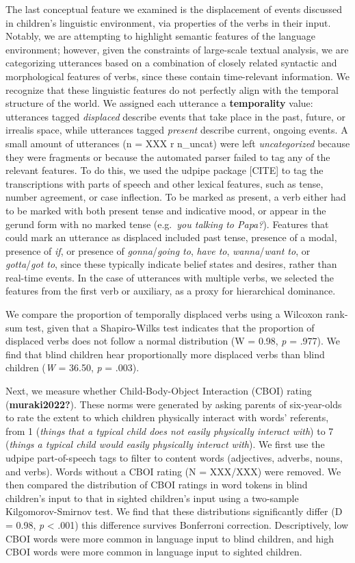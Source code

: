 \documentclass[
  man,floatsintext]{apa6}
\begin{document}
The last conceptual feature we examined is the displacement of events discussed in children's linguistic environment, via properties of the verbs in their input. Notably, we are attempting to highlight semantic features of the language environment; however, given the constraints of large-scale textual analysis, we are categorizing utterances based on a combination of closely related syntactic and morphological features of verbs, since these contain time-relevant information. We recognize that these linguistic features do not perfectly align with the temporal structure of the world. We assigned each utterance a \textbf{temporality} value: utterances tagged \emph{displaced} describe events that take place in the past, future, or irrealis space, while utterances tagged \emph{present} describe current, ongoing events. A small amount of utterances (n = XXX r n\_uncat) were left \emph{uncategorized} because they were fragments or because the automated parser failed to tag any of the relevant features. To do this, we used the udpipe package {[}CITE{]} to tag the transcriptions with parts of speech and other lexical features, such as tense, number agreement, or case inflection. To be marked as present, a verb either had to be marked with both present tense and indicative mood, or appear in the gerund form with no marked tense (e.g.~\emph{you talking to Papa?}). Features that could mark an utterance as displaced included past tense, presence of a modal, presence of \emph{if}, or presence of \emph{gonna}/\emph{going to}, \emph{have to}, \emph{wanna}/\emph{want to}, or \emph{gotta}/\emph{got to}, since these typically indicate belief states and desires, rather than real-time events. In the case of utterances with multiple verbs, we selected the features from the first verb or auxiliary, as a proxy for hierarchical dominance.

We compare the proportion of temporally displaced verbs using a Wilcoxon rank-sum test, given that a Shapiro-Wilks test indicates that the proportion of displaced verbs does not follow a normal distribution (W = 0.98, \emph{p} = .977). We find that blind children hear proportionally more displaced verbs than blind children (\emph{W} = 36.50, \emph{p} = .003).

Next, we measure whether Child-Body-Object Interaction (CBOI) rating (\textbf{muraki2022?}). These norms were generated by asking parents of six-year-olds to rate the extent to which children physically interact with words' referents, from 1 (\emph{things that a typical child does not easily physically interact with}) to 7 (\emph{things a typical child would easily physically interact with}). We first use the udpipe part-of-speech tags to filter to content words (adjectives, adverbs, nouns, and verbs). Words without a CBOI rating (N = XXX/XXX) were removed. We then compared the distribution of CBOI ratings in word tokens in blind children's input to that in sighted children's input using a two-sample Kilgomorov-Smirnov test. We find that these distributions significantly differ (D = 0.98, \emph{p} \textless{} .001) this difference survives Bonferroni correction. Descriptively, low CBOI words were more common in language input to blind children, and high CBOI words were more common in language input to sighted children.
\end{document}
